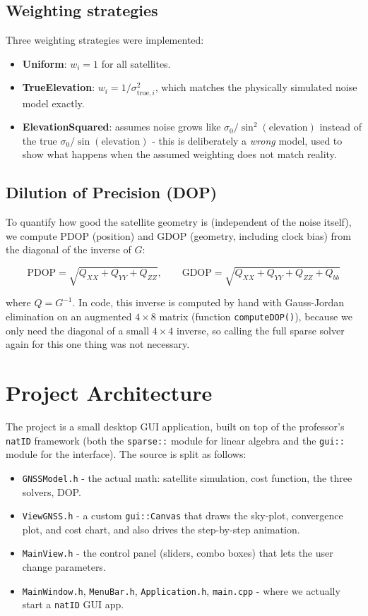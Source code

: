 \documentclass[11pt]{article}
\begin{document}
\subsection{Weighting strategies}

Three weighting strategies were implemented:

\begin{itemize}
    \item \textbf{Uniform}: $w_i = 1$ for all satellites.
    \item \textbf{TrueElevation}: $w_i = 1/\sigma_{\text{true},i}^2$, which matches the physically simulated noise model exactly.
    \item \textbf{ElevationSquared}: assumes noise grows like $\sigma_0/\sin^2(\text{elevation})$ instead of the true $\sigma_0/\sin(\text{elevation})$ - this is deliberately a \emph{wrong} model, used to show what happens when the assumed weighting does not match reality.
\end{itemize}

\subsection{Dilution of Precision (DOP)}

To quantify how good the satellite geometry is (independent of the noise itself), we compute PDOP (position) and GDOP (geometry, including clock bias) from the diagonal of the inverse of $G$:

\[
\text{PDOP} = \sqrt{Q_{XX} + Q_{YY} + Q_{ZZ}}, \qquad
\text{GDOP} = \sqrt{Q_{XX} + Q_{YY} + Q_{ZZ} + Q_{bb}}
\]

where $Q = G^{-1}$. In code, this inverse is computed by hand with Gauss-Jordan elimination on an augmented $4\times8$ matrix (function \texttt{computeDOP()}), because we only need the diagonal of a small $4\times4$ inverse, so calling the full sparse solver again for this one thing was not necessary.

\section{Project Architecture}

The project is a small desktop GUI application, built on top of the professor's \texttt{natID} framework (both the \texttt{sparse::} module for linear algebra and the \texttt{gui::} module for the interface). The source is split as follows:

\begin{itemize}
    \item \texttt{GNSSModel.h} - the actual math: satellite simulation, cost function, the three solvers, DOP.
    \item \texttt{ViewGNSS.h} - a custom \texttt{gui::Canvas} that draws the sky-plot, convergence plot, and cost chart, and also drives the step-by-step animation.
    \item \texttt{MainView.h} - the control panel (sliders, combo boxes) that lets the user change parameters.
    \item \texttt{MainWindow.h}, \texttt{MenuBar.h}, \texttt{Application.h}, \texttt{main.cpp} -  where we actually start a \texttt{natID} GUI app.
\end{itemize}
\end{document}
